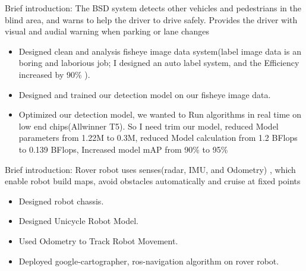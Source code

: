 \documentclass{resume}
\begin{document}

Brief introduction: The BSD system detects other vehicles and pedestrians in the blind area, and warns to help the driver to drive safely. Provides the driver with visual and audial warning when parking or lane changes

\begin{itemize}
  \item Designed clean and analysis fisheye image data system(label image data is an boring and laborious job; I designed an auto label system, and the Efficiency increased by 90\% ).
  \item Designed and trained our detection model on our fisheye image data.
  \item Optimized our detection model, we wanted to Run algorithms in real time on low end chips(Allwinner T5). So I need trim our model, reduced Model parameters from 1.22M to 0.3M, reduced Model calculation from 1.2 BFlops to 0.139 BFlops, Increased model mAP from 90\% to 95\%
\end{itemize}



Brief introduction: Rover robot uses senses(radar, IMU, and Odometry) , which enable robot build maps, avoid obstacles automatically and cruise at fixed points

\begin{itemize}
  \item Designed robot chassis.
  \item Designed Unicycle Robot Model.
  \item Used Odometry to Track Robot Movement.
  \item Deployed google-cartographer, ros-navigation algorithm on rover robot.
\end{itemize}

\end{document}
